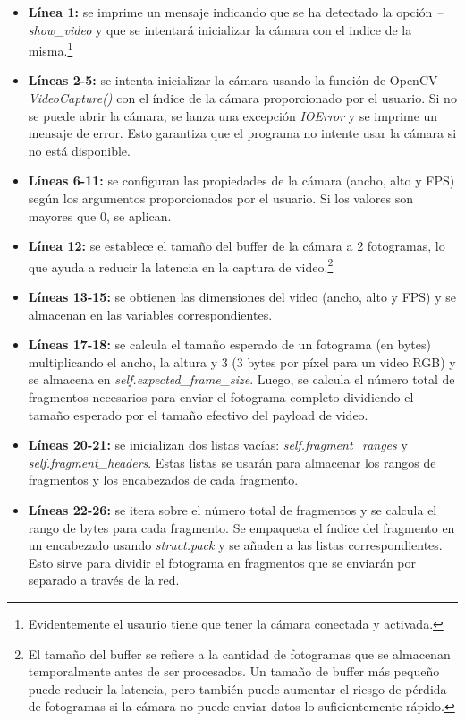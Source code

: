 \begin{itemize}
    \item \textbf{Línea 1:} se imprime un mensaje indicando que se ha detectado la opción \textit{--show\_video} y que se intentará inicializar la cámara con el indice de la misma.\footnote{Evidentemente el usaurio tiene que tener la cámara conectada y activada.}
    \item \textbf{Líneas 2-5:} se intenta inicializar la cámara usando la función de OpenCV \textit{VideoCapture()} con el índice de la cámara proporcionado por el usuario. Si no se puede abrir la cámara, se lanza una excepción \textit{IOError} y se imprime un mensaje de error. Esto garantiza que el programa no intente usar la cámara si no está disponible.
    \item \textbf{Líneas 6-11:} se configuran las propiedades de la cámara (ancho, alto y FPS) según los argumentos proporcionados por el usuario. Si los valores son mayores que 0, se aplican.
    \item \textbf{Línea 12:} se establece el tamaño del buffer de la cámara a 2 fotogramas, lo que ayuda a reducir la latencia en la captura de video.\footnote{El tamaño del buffer se refiere a la cantidad de fotogramas que se almacenan temporalmente antes de ser procesados. Un tamaño de buffer más pequeño puede reducir la latencia, pero también puede aumentar el riesgo de pérdida de fotogramas si la cámara no puede enviar datos lo suficientemente rápido.}
    \item \textbf{Líneas 13-15:} se obtienen las dimensiones del video (ancho, alto y FPS) y se almacenan en las variables correspondientes.
    \item \textbf{Líneas 17-18:} se calcula el tamaño esperado de un fotograma (en bytes) multiplicando el ancho, la altura y 3 (3 bytes por píxel para un video RGB) y se almacena en \textit{self.expected\_frame\_size}. Luego, se calcula el número total de fragmentos necesarios para enviar el fotograma completo dividiendo el tamaño esperado por el tamaño efectivo del payload de video.
    \item \textbf{Líneas 20-21:} se inicializan dos listas vacías: \textit{self.fragment\_ranges} y \textit{self.fragment\_headers}. Estas listas se usarán para almacenar los rangos de fragmentos y los encabezados de cada fragmento.
    \item \textbf{Líneas 22-26:} se itera sobre el número total de fragmentos y se calcula el rango de bytes para cada fragmento. Se empaqueta el índice del fragmento en un encabezado usando \textit{struct.pack} y se añaden a las listas correspondientes. Esto sirve para dividir el fotograma en fragmentos que se enviarán por separado a través de la red.

\end{itemize}
